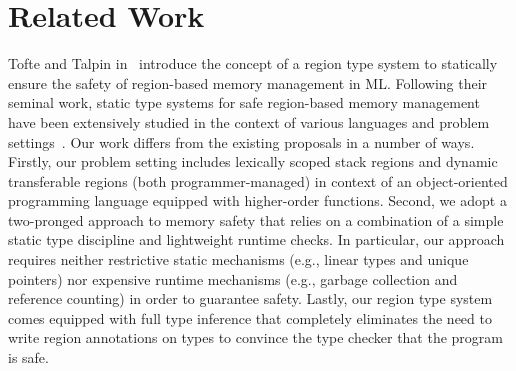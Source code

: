 \section{Related Work}
\label{sec:related-work}


Tofte and Talpin in~\cite{tofte93,tofte94,tofte97} introduce the
concept of a region type system to statically ensure the safety of
region-based memory management in ML. Following their seminal work,
static type systems for safe region-based memory management have been
extensively studied in the context of various languages and problem
settings~\cite{cyclone02, cyclone04, yates99, MIT03, DPJ09, HMN01,
WW01, rust}. Our work differs from the existing proposals in a number
of ways. Firstly, our problem setting includes lexically scoped stack
regions and dynamic transferable regions (both programmer-managed) in
context of an object-oriented programming language equipped with
higher-order functions. Second, we adopt a two-pronged approach to
memory safety that relies on a combination of a simple static type
discipline and lightweight runtime checks. 
In particular, our approach requires neither restrictive static
mechanisms (e.g., linear types and unique pointers) nor expensive
runtime mechanisms (e.g., garbage collection and reference counting)
in order to guarantee safety. Lastly, our region type system comes
equipped with full type inference that completely eliminates the need
to write region annotations on types to convince the type checker that
the program is safe. 

